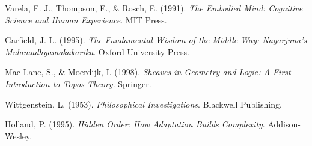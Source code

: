 \documentclass{article}
\begin{document}
\begin{thebibliography}{9}

Varela, F. J., Thompson, E., \& Rosch, E. (1991). \textit{The Embodied Mind: Cognitive Science and Human Experience}. MIT Press.

Garfield, J. L. (1995). \textit{The Fundamental Wisdom of the Middle Way: Nāgārjuna's Mūlamadhyamakakārikā}. Oxford University Press.

Mac Lane, S., \& Moerdijk, I. (1998). \textit{Sheaves in Geometry and Logic: A First Introduction to Topos Theory}. Springer.

Wittgenstein, L. (1953). \textit{Philosophical Investigations}. Blackwell Publishing.

Holland, P. (1995). \textit{Hidden Order: How Adaptation Builds Complexity}. Addison-Wesley.

\end{thebibliography}
\end{document}

